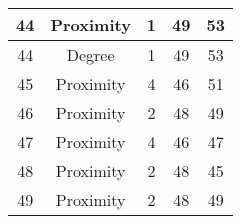 \documentclass[results.tex]{subfiles}
\begin{document}
\begin{center}
\begin{tabular}{| c || c | c | c | c |}
            \hline
            44                      & Proximity                    & 1                      & 49                      & 53                   \\
            \hline
            44                      & Degree                       & 1                      & 49                      & 53                   \\
            \hline
            45                      & Proximity                    & 4                      & 46                      & 51                   \\
            \hline
            46                      & Proximity                    & 2                      & 48                      & 49                   \\
            \hline
            47                      & Proximity                    & 4                      & 46                      & 47                   \\
            \hline
            48                      & Proximity                    & 2                      & 48                      & 45                   \\
            \hline
            49                      & Proximity                    & 2                      & 48                      & 49                   \\
            \hline
        \end{tabular}
    \end{center}
\end{document}
